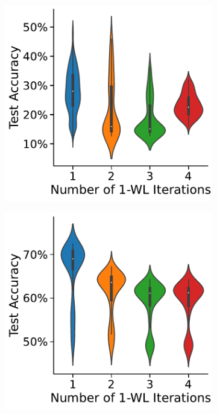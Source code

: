 \begin{figure}[thb]
	\centering
	\begin{subfigure}[b]{0.19\textwidth}
		\centering
		\includegraphics[width=\textwidth]{Figures/k_wl_violin_ENZYMES.pdf}
        \caption{\scriptsize\enzymes}
	\end{subfigure}
	\hfill
	\begin{subfigure}[b]{0.19\textwidth}
		\centering
		\includegraphics[width=\textwidth]{Figures/k_wl_violin_IMDB-BINARY.pdf}

\end{subfigure}
\end{figure}
